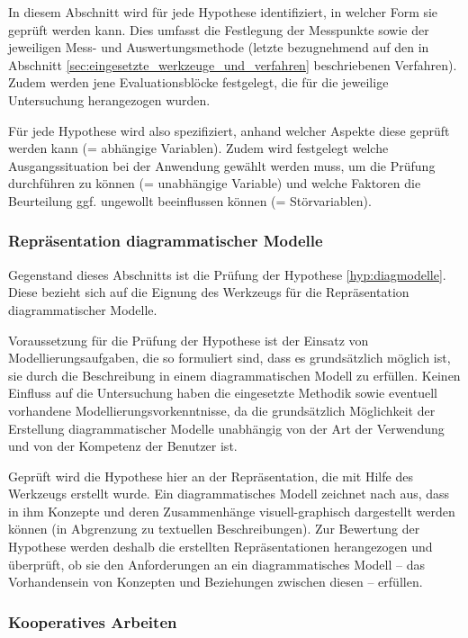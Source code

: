 In diesem Abschnitt wird für jede Hypothese identifiziert, in welcher Form sie geprüft werden kann. Dies umfasst die Festlegung der Messpunkte sowie der jeweiligen Mess- und Auswertungsmethode (letzte bezugnehmend auf den in Abschnitt \ref{sec:eingesetzte_werkzeuge_und_verfahren} beschriebenen Verfahren). Zudem werden jene Evaluationsblöcke festgelegt, die für die jeweilige Untersuchung herangezogen wurden.

Für jede Hypothese wird also spezifiziert, anhand welcher Aspekte diese geprüft werden kann (= abhängige Variablen). Zudem wird festgelegt welche Ausgangssituation bei der Anwendung gewählt werden muss, um die Prüfung durchführen zu können (= unabhängige Variable) und welche Faktoren die Beurteilung ggf. ungewollt beeinflussen können (= Störvariablen).

\subsubsection{Repräsentation diagrammatischer Modelle} %
\label{ssub:repräsentation}

Gegenstand dieses Abschnitts ist die Prüfung der Hypothese \ref{hyp:diagmodelle}. Diese bezieht sich auf die Eignung des Werkzeugs für die Repräsentation diagrammatischer Modelle.

Voraussetzung für die Prüfung der Hypothese ist der Einsatz von Modellierungsaufgaben, die so formuliert sind, dass es grundsätzlich möglich ist, sie durch die Beschreibung in einem diagrammatischen Modell zu erfüllen. Keinen Einfluss auf die Untersuchung haben die eingesetzte Methodik sowie eventuell vorhandene Modellierungsvorkenntnisse, da die grundsätzlich Möglichkeit der Erstellung diagrammatischer Modelle unabhängig von der Art der Verwendung und von der Kompetenz der Benutzer ist. 

Geprüft wird die Hypothese hier an der Repräsentation, die mit Hilfe des Werkzeugs erstellt wurde. Ein diagrammatisches Modell zeichnet nach \citep{Larkin87} aus, dass in ihm Konzepte und deren Zusammenhänge visuell-graphisch dargestellt werden können (in Abgrenzung zu textuellen Beschreibungen). Zur Bewertung der Hypothese werden deshalb die erstellten Repräsentationen herangezogen und überprüft, ob sie den Anforderungen an ein diagrammatisches Modell -- das Vorhandensein von Konzepten und Beziehungen zwischen diesen -- erfüllen.


\subsubsection{Kooperatives Arbeiten} %
\label{ssub:kollaboratives_arbeiten}

